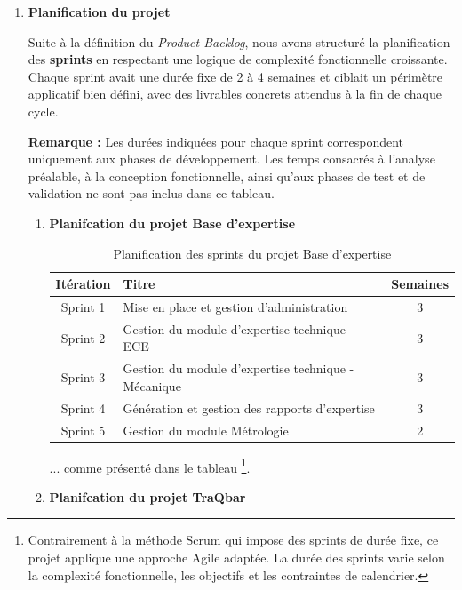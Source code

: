 \documentclass[11pt,a4paper]{article}
\begin{document}
\begin{enumerate}
\item \textbf{Planification du projet} 

Suite à la définition du \textit{Product Backlog}, nous avons structuré la planification des \textbf{sprints} en respectant une logique de complexité fonctionnelle croissante. Chaque sprint avait une durée fixe de 2 à 4 semaines et ciblait un périmètre applicatif bien défini, avec des livrables concrets attendus à la fin de chaque cycle.

\textbf{Remarque :} Les durées indiquées pour chaque sprint correspondent uniquement aux phases de développement. Les temps consacrés à l’analyse préalable, à la conception fonctionnelle, ainsi qu’aux phases de test et de validation ne sont pas inclus dans ce tableau.

	\begin{enumerate}
	\item \textbf{Planifcation du projet Base d'expertise}
	
\begin{table}[H]
\centering
\begin{tabular}{|c|p{8cm}|c|}
\hline
\textbf{Itération} & \textbf{Titre} & \textbf{Semaines} \\
\hline
Sprint 1 & Mise en place et gestion d'administration & 3 \\
\hline
Sprint 2 & Gestion du module d'expertise technique - ECE & 3 \\
\hline
Sprint 3  & Gestion du module d'expertise technique - Mécanique  & 3 \\
\hline
Sprint 4 & Génération et gestion des rapports d'expertise & 3 \\
\hline
Sprint 5 & Gestion du module Métrologie & 2 \\
\hline
\end{tabular}
\caption{Planification des sprints du projet Base d'expertise}
\label{tab:planification_projet1}
\end{table}

... comme présenté dans le tableau \footnote{Contrairement à la méthode Scrum qui impose des sprints de durée fixe, ce projet applique une approche Agile adaptée. La durée des sprints varie selon la complexité fonctionnelle, les objectifs et les contraintes de calendrier.}.

\newpage
	\item \textbf{Planifcation du projet TraQbar}
	

\end{enumerate}
\end{enumerate}
\end{document}
